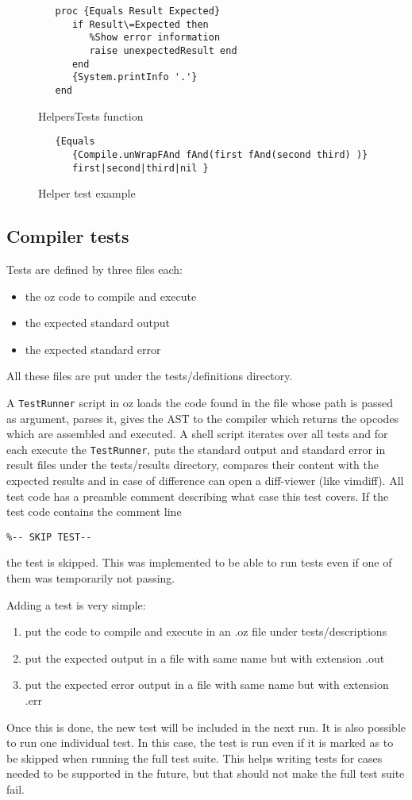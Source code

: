 \documentclass[a4paper]{memoir}
\begin{document}
\begin{figure}
\begin{lstlisting}
   proc {Equals Result Expected}
      if Result\=Expected then
         %Show error information
         raise unexpectedResult end
      end
      {System.printInfo '.'}
   end
\end{lstlisting}
\label{fig:helperstestsfunction}
\caption{HelpersTests function}
\end{figure}

\begin{figure}
\begin{lstlisting}
   {Equals 
      {Compile.unWrapFAnd fAnd(first fAnd(second third) )}
      first|second|third|nil }
\end{lstlisting}
\label{fig:helperstestsexample}
\caption{Helper test example}
\end{figure}
\subsection{Compiler tests}
Tests are defined by three files each:
\begin{itemize}
  \item the oz code to compile and execute
  \item the expected standard output
  \item the expected standard error
\end{itemize}
All these files are put under the tests/definitions directory.

A \lstinline!TestRunner! script in oz loads the code found in the file whose path is passed as argument, parses it, gives the AST to the compiler which returns the opcodes which are assembled and executed. 
A shell script iterates over all tests and for each execute the
\lstinline!TestRunner!, puts the standard output and standard error in result
files under the tests/results directory, compares their content with the
expected results and in case of difference can open a diff-viewer (like vimdiff).
All test code has a preamble comment describing what case this test covers.
If the test code contains the comment line
\begin{lstlisting}
%-- SKIP TEST-- 
\end{lstlisting}
the test is skipped. This was implemented to be able to run tests even if one of them was temporarily not passing.

Adding a test is very simple:
\begin{enumerate}
  \item put the code to compile and execute in an .oz file under tests/descriptions
  \item put the expected output in a file with same name but with extension .out
  \item put the expected error output in a file with same name but with extension .err
\end{enumerate}
Once this is done, the new test will be included in the next run.
It is also possible to run one individual test. In this case, the test is run
even if it is marked as to be skipped when running the full test suite. This helps writing tests for cases needed to be supported in the future, but that should not make the full test suite fail.
\end{document}
